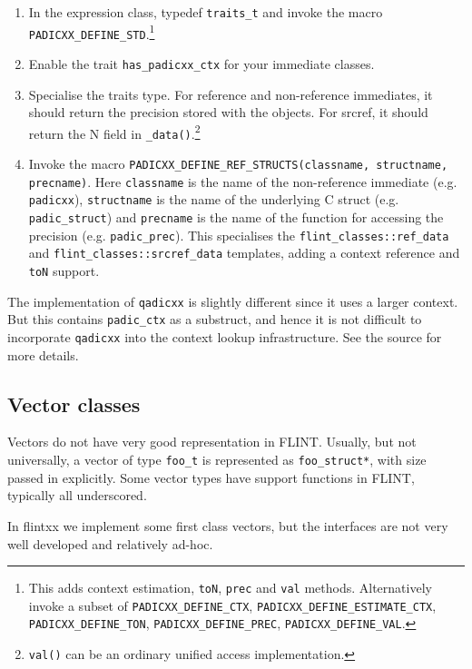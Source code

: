 \documentclass[a4paper,10pt]{book}
\newcommand{\code}{\lstinline}
\begin{document}
{{\begin{enumerate}
\item In the expression class, typedef \code{traits_t} and invoke the macro
  \code{PADICXX_DEFINE_STD}.\footnote{This adds context estimation, \code{toN},
  \code{prec} and \code{val} methods. Alternatively invoke a subset of
  \code{PADICXX_DEFINE_CTX}, \code{PADICXX_DEFINE_ESTIMATE_CTX},
  \code{PADICXX_DEFINE_TON}, \code{PADICXX_DEFINE_PREC},
  \code{PADICXX_DEFINE_VAL}.}

\item Enable the trait \code{has_padicxx_ctx} for your immediate classes.

\item Specialise the traits type. For reference and non-reference immediates,
  it should return the precision stored with the objects. For srcref, it should
  return the N field in \code{_data()}.\footnote{\code{val()} can be an ordinary
  unified access implementation.}

\item Invoke the macro
  \code{PADICXX_DEFINE_REF_STRUCTS(classname, structname, precname)}.
  Here \code{classname} is the name of the non-reference immediate (e.g.
  \code{padicxx}), \code{structname} is the name of the underlying C struct (e.g.
  \code{padic_struct}) and \code{precname} is the name of the function for
  accessing the precision (e.g. \code{padic_prec}). This specialises the
  \code{flint_classes::ref_data} and \code{flint_classes::srcref_data}
  templates, adding a context reference and \code{toN} support.
\end{enumerate}

The implementation of \code{qadicxx} is slightly different since it uses a
larger context. But this contains \code{padic_ctx} as a substruct, and hence it
is not difficult to incorporate \code{qadicxx} into the context lookup
infrastructure. See the source for more details.

\subsection{Vector classes}

Vectors do not have very good representation in FLINT. Usually, but not
universally, a vector of type
\code{foo_t} is represented as \code{foo_struct*}, with size passed in
explicitly. Some vector types have support functions in FLINT, typically all
underscored.

In flintxx we implement some first class vectors, but the interfaces are not
very well developed and relatively ad-hoc.

}}
\end{document}
